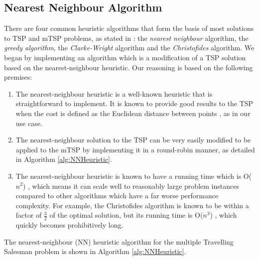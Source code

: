 \subsection{Nearest Neighbour Algorithm}
There are four common heuristic algorithms that form the basis of most solutions to TSP and mTSP problems, as stated in \cite{Johnson1997TheOptimization}: the \textit{nearest neighbour} algorithm, the \textit{greedy algorithm}, the \textit{Clarke-Wright} algorithm and the \textit{Christofides} algorithm. We began by implementing an algorithm which is a modification of a TSP solution based on the nearest-neighbour heuristic. Our reasoning is based on the following premises:
\begin{enumerate}
    \item The nearest-neighbour heuristic is a well-known heuristic that is straightforward to implement. It is known to provide good results to the TSP when the cost is defined as the Euclidean distance between points \cite{Johnson1997TheOptimization}, as in our use case.
    \item The nearest-neighbour solution to the TSP can be very easily modified to be applied to the mTSP by implementing it in a round-robin manner, as detailed in Algorithm \ref{alg:NNHeuristic}.
    \item The nearest-neighbour heuristic is known to have a running time which is O($n^2$) \cite{Rosenkrantz1977AnProblem}, which means it can scale well to reasonably large problem instances compared to other algorithms which have a far worse performance complexity. For example, the Christofides algorithm is known to be within a factor of $\frac{3}{2}$ of the optimal solution, but its running time is O($n^3$) \cite{Christofides1976WORST-CASEPROBLEM}, which quickly becomes prohibitively long.
\end{enumerate}

The nearest-neighbour (NN) heuristic algorithm for the multiple Travelling Salesman problem is shown in Algorithm \ref{alg:NNHeuristic}.



